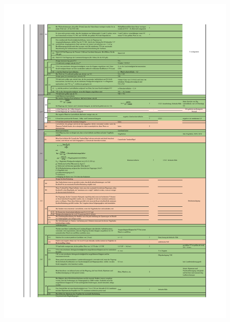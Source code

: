 \begin{table}[H]
\centering
\includegraphics[width=0.9\textwidth]{bilder/Tabellen/MPP_Konstruktion_2.pdf}
\end{table}

